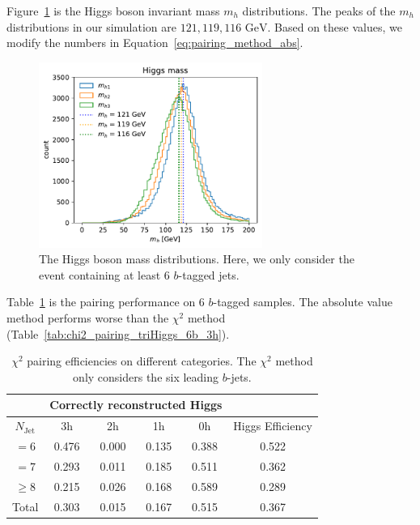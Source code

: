 \documentclass[12pt]{article}
\begin{document}
    Figure~\ref{fig:mh_distribution_6b} is the Higgs boson invariant mass $m_h$ distributions. The peaks of the $m_{h}$ distributions in our simulation are $121, 119, 116 \text{ GeV}$. Based on these values, we modify the numbers in Equation~\ref{eq:pairing_method_abs}.
    \begin{figure}[htpb]
        \centering
        \includegraphics[width=0.65\textwidth]{mh_distribution_6b.pdf}
        \caption{The Higgs boson mass distributions. Here, we only consider the event containing at least 6 $b$-tagged jets.}
        \label{fig:mh_distribution_6b}
    \end{figure}
    Table~\ref{tab:chi2_abs_pairing_triHiggs_6b_3h} is the pairing performance on 6 $b$-tagged samples. The absolute value method performs worse than the $\chi^2$ method (Table~\ref{tab:chi2_pairing_triHiggs_6b_3h}).
    \begin{table}[htpb]
        \centering
        \caption{$\chi^2$ pairing efficiencies on different categories. The $\chi^2$ method only considers the six leading $b$-jets.}
        \label{tab:chi2_abs_pairing_triHiggs_6b_3h}
        \begin{tabular}{c|cccc|c}
            \multicolumn{1}{l|}{} & \multicolumn{4}{c|}{Correctly reconstructed Higgs} & \multicolumn{1}{l}{} \\ \hline
            $N_\text{Jet}$        & 3h          & 2h         & 1h         & 0h         & Higgs Efficiency     \\ \hline
            $=6$                  & 0.476       & 0.000      & 0.135      & 0.388      & 0.522                \\
            $=7$                  & 0.293       & 0.011      & 0.185      & 0.511      & 0.362                \\
            $\ge 8$               & 0.215       & 0.026      & 0.168      & 0.589      & 0.289                \\ \hline
            Total                 & 0.303       & 0.015      & 0.167      & 0.515      & 0.367
        \end{tabular}
    \end{table}
\end{document}
